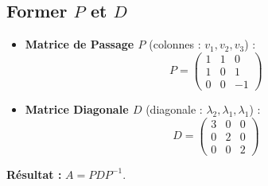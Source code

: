 \documentclass[french]{yLectureNote}
\begin{document}
\subsection{Former $P$ et $D$}

\begin{itemize}
    \item \textbf{Matrice de Passage $P$} (colonnes : $v_1, v_2, v_3$) :
    $$P = \begin{pmatrix} 1 & 1 & 0 \\ 1 & 0 & 1 \\ 0 & 0 & -1 \end{pmatrix}$$

    \item \textbf{Matrice Diagonale $D$} (diagonale : $\lambda_2, \lambda_1, \lambda_1$) :
    $$D = \begin{pmatrix} 3 & 0 & 0 \\ 0 & 2 & 0 \\ 0 & 0 & 2 \end{pmatrix}$$
\end{itemize}

\textbf{Résultat :} $A = P D P^{-1}$.
\end{document}
